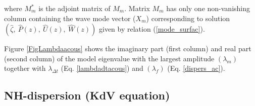 \documentclass[a4paper,11pt]{article}
\begin{document}
where $M_m^*$ is the adjoint matrix of $M_m$. Matrix $M_m$ has only one non-vanishing column containing the wave mode vector ($X_m$) corresponding to solution $(\hat{\zeta},\ \hat{P}(z),\ \hat{U}(z),\ \hat{W}(z))$ given by relation (\ref{mode_surfac}).

Figure \ref{FigLambdaacous} shows the imaginary part (first column) and real part (second column) of the model eigenvalue with the largest amplitude $(\lambda_m)$ together with $\lambda_{\Delta t}$ (Eq. \ref{lambdadtacous}) and $(\lambda_f)$ (Eq. \ref{dispers_ac}).

 

\subsection{NH-dispersion (KdV equation) }
\end{document}
